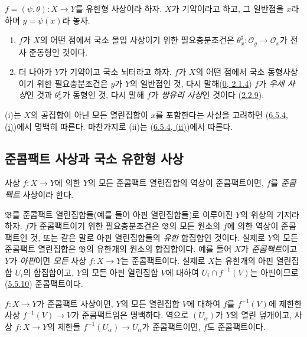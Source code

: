 \begin{corollary}[6.5.5]
\label{I.6.5.5-ko}
$f=(\psi,\theta):X\to Y$를 유한형 사상이라 하자. $X$가 기약이라고 하고,
그 일반점을 $x$라 하며 $y=\psi(x)$라 놓자.
\begin{enumerate}
  \item[\rm(i)] $f$가 $X$의 어떤 점에서 국소 몰입 사상이기 위한
    필요충분조건은
    $\theta_x^\sharp:\mathscr{O}_y\to\mathscr{O}_x$가 전사 준동형인 것이다.
  \item[\rm(ii)] 더 나아가 $Y$가 기약이고 국소 뇌터라고 하자. $f$가
    $X$의 어떤 점에서 국소 동형사상이기 위한 필요충분조건은 $y$가 $Y$의
    일반점인 것, 다시 말해(\hyperref[0.2.1.4-ko]{0, 2.1.4}) $f$가
    \emph{우세 사상}인 것과 $\theta_x^\sharp$가 동형인 것, 다시 말해
    $f$가 \emph{쌍유리 사상}인 것이다
    (\hyperref[I.2.2.9-ko]{2.2.9}).
\end{enumerate}
\end{corollary}

(i)는 $X$의 공집합이 아닌 모든 열린집합이 $x$를 포함한다는 사실을
고려하면 (\hyperref[I.6.5.4-ko]{6.5.4, (i)})에서 명백히 따른다. 마찬가지로
(ii)는 (\hyperref[I.6.5.4-ko]{6.5.4, (ii)})에서 따른다.

\subsection{준콤팩트 사상과 국소 유한형 사상}
\label{subsection:I.6.6-ko}

\begin{definition}[6.6.1]
\label{I.6.6.1-ko}
사상 $f:X\to Y$에 의한 $Y$의 모든 준콤팩트 열린집합의 역상이
준콤팩트이면, $f$를 \emph{준콤팩트} 사상이라 한다.
\end{definition}

$\mathfrak{B}$를 준콤팩트 열린집합들(예를 들어 아핀 열린집합들)로
이루어진 $Y$의 위상의 기저라 하자. $f$가 준콤팩트이기 위한 필요충분조건은
$\mathfrak{B}$의 모든 원소의 $f$에 의한 역상이 준콤팩트인 것, 또는 같은
말로 아핀 열린집합들의 \emph{유한} 합집합인 것이다. 실제로 $Y$의 모든
준콤팩트 열린집합은 $\mathfrak{B}$의 유한개의 원소의 합집합이다. 예를 들어
$X$가 \emph{준콤팩트}이고 $Y$가 \emph{아핀}이면 \emph{모든} 사상
$f:X\to Y$는 준콤팩트이다. 실제로 $X$는 유한개의 아핀 열린집합 $U_i$의
합집합이고, $Y$의 모든 아핀 열린집합 $V$에 대하여
$U_i\cap f^{-1}(V)$는 아핀이므로
(\hyperref[I.5.5.10-ko]{5.5.10}) 준콤팩트이다.

$f:X\to Y$가 준콤팩트 사상이면, $Y$의 모든 열린집합 $V$에 대하여
$f$를 $f^{-1}(V)$에 제한한 사상 $f^{-1}(V)\to V$가 준콤팩트임은
명백하다. 역으로 $(U_\alpha)$가 $Y$의 열린 덮개이고, 사상 $f:X\to Y$의
제한들 $f^{-1}(U_\alpha)\to U_\alpha$가 준콤팩트이면, $f$도
준콤팩트이다.

